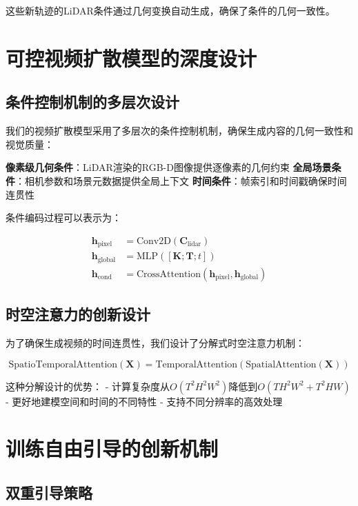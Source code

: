 这些新轨迹的LiDAR条件通过几何变换自动生成，确保了条件的几何一致性。

\section{可控视频扩散模型的深度设计}

\subsection{条件控制机制的多层次设计}

我们的视频扩散模型采用了多层次的条件控制机制，确保生成内容的几何一致性和视觉质量：

\textbf{像素级几何条件}：LiDAR渲染的RGB-D图像提供逐像素的几何约束
\textbf{全局场景条件}：相机参数和场景元数据提供全局上下文
\textbf{时间条件}：帧索引和时间戳确保时间连贯性

条件编码过程可以表示为：

\begin{align}
\mathbf{h}_{\text{pixel}} &= \text{Conv2D}(\mathbf{C}_{\text{lidar}}) \\
\mathbf{h}_{\text{global}} &= \text{MLP}([\mathbf{K}; \mathbf{T}; t]) \\
\mathbf{h}_{\text{cond}} &= \text{CrossAttention}(\mathbf{h}_{\text{pixel}}, \mathbf{h}_{\text{global}})
\label{eq:condition_encoding_multilevel}
\end{align}

\subsection{时空注意力的创新设计}

为了确保生成视频的时间连贯性，我们设计了分解式时空注意力机制：

\begin{equation}
\text{SpatioTemporalAttention}(\mathbf{X}) = \text{TemporalAttention}(\text{SpatialAttention}(\mathbf{X}))
\label{eq:factorized_attention}
\end{equation}

这种分解设计的优势：
- 计算复杂度从$O(T^2H^2W^2)$降低到$O(TH^2W^2 + T^2HW)$
- 更好地建模空间和时间的不同特性
- 支持不同分辨率的高效处理

\section{训练自由引导的创新机制}

\subsection{双重引导策略}

